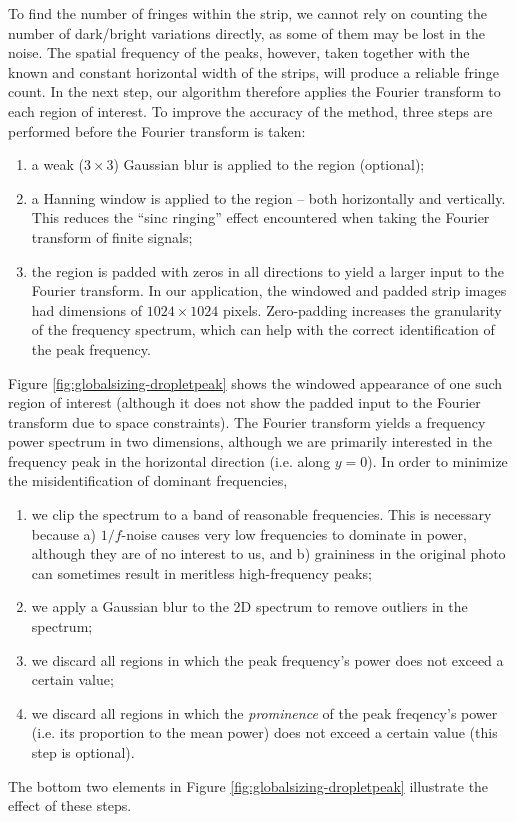\documentclass[11.5pt]{book}
\begin{document}
To find the number of fringes within the strip, we cannot rely on counting the
number of dark/bright variations directly, as some of them may be lost in the
noise. The spatial frequency of the peaks, however, taken together with the
known and constant horizontal width of the strips, will produce a reliable
fringe count. In the next step, our algorithm therefore applies the Fourier
transform to each region of interest. To improve the accuracy of the method,
three steps are performed before the Fourier transform is taken:
\begin{enumerate}
    \item a weak ($3 \times 3$) Gaussian blur is applied to the region
        (optional);
    \item a Hanning window is applied to the region -- both horizontally and
        vertically. This reduces the ``sinc ringing'' effect encountered when
        taking the Fourier transform of finite signals;
    \item the region is padded with zeros in all directions to yield a larger
        input to the Fourier transform. In our application, the windowed and padded strip
        images had dimensions of $1024 \times 1024$ pixels. Zero-padding
        increases the granularity of the frequency spectrum, which can help with
        the correct identification of the peak frequency.
\end{enumerate}

Figure \ref{fig:globalsizing-dropletpeak} shows the windowed appearance of
one such region of interest (although it does not show the padded input to the
Fourier transform due to space constraints). The Fourier transform yields a
frequency power spectrum in two dimensions, although we are primarily interested
in the frequency peak in the horizontal direction (i.e. along $y=0$). In order
to minimize the misidentification of dominant frequencies,
\begin{enumerate}
    \item we clip the spectrum to a band of reasonable frequencies. This is
        necessary because a) $1/f$-noise causes very low frequencies to dominate
        in power, although they are of no interest to us, and b) graininess in
        the original photo can sometimes result in meritless high-frequency
        peaks;
    \item we apply a Gaussian blur to the 2D spectrum to remove outliers in the
        spectrum;
    \item we discard all regions in which the peak frequency's power does not
        exceed a certain value;
    \item we discard all regions in which the \textit{prominence} of the peak
        freqency's power (i.e. its proportion to the mean power) does not exceed
        a certain value (this step is optional).
\end{enumerate}
The bottom two elements in Figure \ref{fig:globalsizing-dropletpeak} illustrate
the effect of these steps.
\end{document}
